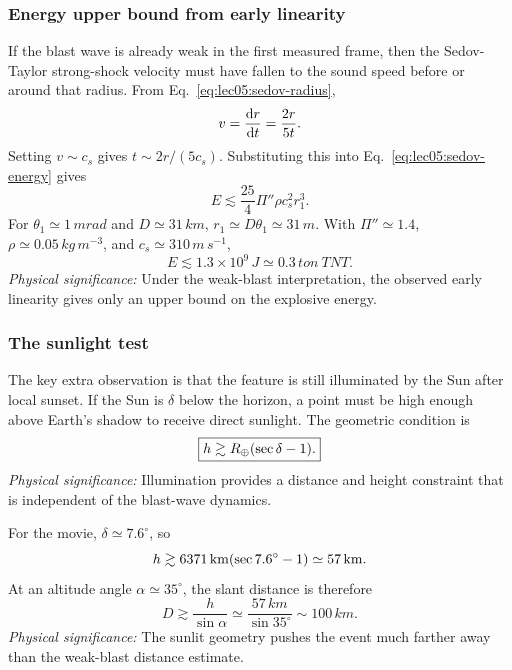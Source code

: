 \subsubsection*{Energy upper bound from early linearity}
If the blast wave is already weak in the first measured frame, then the
Sedov-Taylor strong-shock velocity must have fallen to the sound speed before
or around that radius. From Eq.~\eqref{eq:lec05:sedov-radius},
\begin{equation}
    v=\dv{r}{t}=\frac{2r}{5t}.
    \label{eq:lec05:sedov-velocity}
\end{equation}
Setting $v\sim c_s$ gives $t\sim2r/(5c_s)$. Substituting this into
Eq.~\eqref{eq:lec05:sedov-energy} gives
\begin{equation}
    E \lesssim
    \frac{25}{4}\Pi''\rho c_s^2 r_1^3 .
    \label{eq:lec05:rocket-energy-bound}
\end{equation}
For $\theta_1\simeq1\,\si{mrad}$ and $D\simeq31\,\si{km}$,
$r_1\simeq D\theta_1\simeq31\,\si{m}$. With
$\Pi''\simeq1.4$, $\rho\simeq0.05\,\si{kg\,m^{-3}}$, and
$c_s\simeq310\,\si{m\,s^{-1}}$,
\begin{equation}
    \boxed{
    E \lesssim 1.3\times10^9\,\si{J}
    \simeq0.3\,\si{ton\ TNT}.
    }
    \label{eq:lec05:rocket-energy-upper-limit}
\end{equation}
\textit{Physical significance:} Under the weak-blast interpretation, the
observed early linearity gives only an upper bound on the explosive energy.

\subsubsection*{The sunlight test}
The key extra observation is that the feature is still illuminated by the Sun
after local sunset. If the Sun is $\delta$ below the horizon, a point must be
high enough above Earth's shadow to receive direct sunlight. The geometric
condition is
\begin{equation}
    \boxed{
    h \gtrsim R_\oplus\qty(\sec\delta-1).
    }
    \label{eq:lec05:sunlit-height}
\end{equation}
\textit{Physical significance:} Illumination provides a distance and height
constraint that is independent of the blast-wave dynamics.

For the movie, $\delta\simeq7.6^\circ$, so
\begin{equation}
    h\gtrsim
    6371\,\si{km}\qty(\sec 7.6^\circ-1)
    \simeq57\,\si{km}.
    \label{eq:lec05:sunlit-height-number}
\end{equation}
At an altitude angle $\alpha\simeq35^\circ$, the slant distance is therefore
\begin{equation}
    \boxed{
    D\gtrsim\frac{h}{\sin\alpha}
    \simeq
    \frac{57\,\si{km}}{\sin35^\circ}
    \sim100\,\si{km}.
    }
    \label{eq:lec05:sunlit-distance}
\end{equation}
\textit{Physical significance:} The sunlit geometry pushes the event much
farther away than the weak-blast distance estimate.


